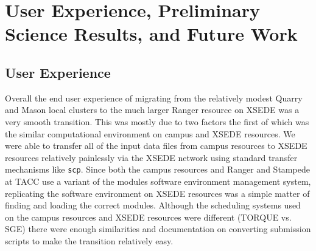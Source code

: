 \documentclass{sig-alternate}
\newcommand{\ty}{\texttt}
\begin{document}


\section{User Experience, Preliminary Science Results, and Future Work}\label{sec:results}
\subsection{User Experience}
Overall the end user experience of migrating from the relatively modest Quarry and Mason local clusters to the
much larger Ranger resource on XSEDE was a very smooth transition. This was mostly due to two factors the
first of which was the similar computational environment on campus and XSEDE resources. We were able to
transfer all of the input data files from campus resources to XSEDE resources relatively painlessly via the
XSEDE network using standard transfer mechanisms like \ty{scp}. Since both the campus resources and Ranger and
Stampede at TACC use a variant of the modules software environment management system, replicating the software
environment on XSEDE resources was a simple matter of finding and loading the correct modules. Although the
scheduling systems used on the campus resources and XSEDE resources were different (TORQUE vs. SGE) there were
enough similarities and documentation on converting submission scripts to make the transition relatively
easy. 
 
\end{document}
